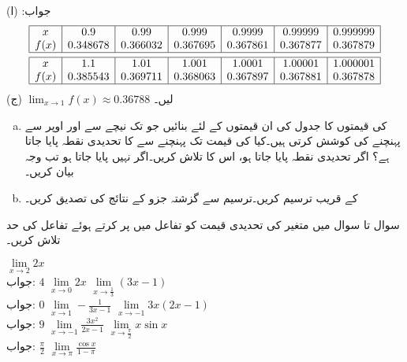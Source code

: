 جواب: (ا)
\begin{align*}
\begin{array}{|c|c|c|c|c|c|c|}
\hline
x&0.9&0.99&0.999&0.9999&0.99999&0.999999\\
f(x)&0.348678&0.366032&0.367695&0.367861&0.367877&0.367879\\
\hline
\end{array}\\
\begin{array}{|c|c|c|c|c|c|c|}
\hline
x&1.1&1.01&1.001&1.0001&1.00001&1.000001\\
f(x)&0.385543&0.369711&0.368063&0.367897&0.367881&0.367878\\
\hline
\end{array}
\end{align*}
(ج)
$\lim_{x\to 1}f(x)\approx 0.36788$
 لیں۔
\begin{enumerate}[a.]
\item
{} کی قیمتوں کا جدول  کی ان قیمتوں کے لئے بنائیں جو  تک نیچے سے اور اوپر سے پہنچنے کی کوشش کرتی ہیں۔کیا
  کی قیمت  تک پہنچنے سے  کا تحدیدی نقطہ پایا جاتا ہے؟ اگر تحدیدی نقطہ پایا جاتا ہو، اس کا تلاش کریں۔اگر نہیں پایا جاتا ہو تب وجہ بیان کریں۔
\item
{} کے قریب  ترسیم کریں۔ترسیم سے گزشتہ جزو کے نتائج کی تصدیق کریں۔
\end{enumerate}

سوال  تا سوال  میں متغیر  کی تحدیدی قیمت کو تفاعل میں پر کرتے ہوئے تفاعل کی حد تلاش کریں۔

$\lim\limits_{x\to 2} 2x$\\
جواب:\quad
$4$
$\lim\limits_{x\to 0} 2x$
$\lim\limits_{x\to \tfrac{1}{3}} (3x-1)$\\
جواب:\quad
$0$
$\lim\limits_{x\to 1} -\tfrac{1}{3x-1}$
$\lim\limits_{x\to -1} 3x(2x-1)$\\
جواب:\quad
$9$
$\lim\limits_{x\to -1} \tfrac{3x^2}{2x-1}$
$\lim\limits_{x\to \tfrac{\pi}{2}} x\sin x$\\
جواب:\quad
$\tfrac{\pi}{2}$
$\lim\limits_{x\to \pi} \tfrac{\cos x}{1-\pi}$

